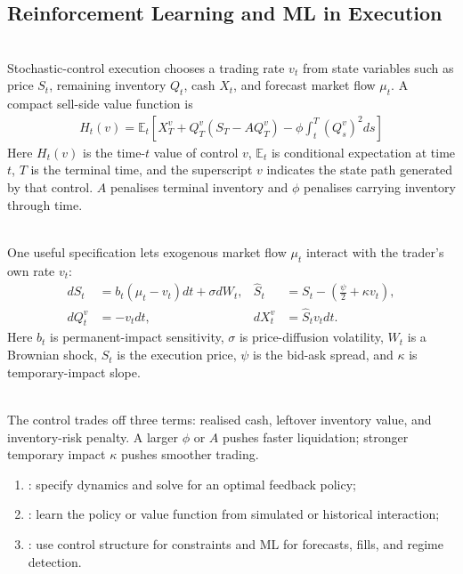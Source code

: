 \subsection{Reinforcement Learning and ML in Execution}

\begin{model} \\
Stochastic-control execution chooses a trading rate $v_t$ from state variables such as price $S_t$, remaining inventory $Q_t$, cash $X_t$, and forecast market flow $\mu_t$. A compact sell-side value function is
\begin{align*}
H_t(v)=\mathbb{E}_t\left[X_T^v+Q_T^v(S_T-AQ_T^v)-\phi\int_t^T(Q_s^v)^2ds\right]
\end{align*}
Here $H_t(v)$ is the time-$t$ value of control $v$, $\mathbb{E}_t$ is conditional expectation at time $t$, $T$ is the terminal time, and the superscript $v$ indicates the state path generated by that control. $A$ penalises terminal inventory and $\phi$ penalises carrying inventory through time.
\end{model}

\begin{model} \\
One useful specification lets exogenous market flow $\mu_t$ interact with the trader's own rate $v_t$:
\begin{align*}
dS_t&=b_t(\mu_t-v_t)dt+\sigma dW_t, & \widehat{S}_t&=S_t-\left(\frac{\psi}{2}+\kappa v_t\right),\\
dQ_t^v&=-v_tdt, & dX_t^v&=\widehat{S}_t v_tdt.
\end{align*}
Here $b_t$ is permanent-impact sensitivity, $\sigma$ is price-diffusion volatility, $W_t$ is a Brownian shock, $\widehat{S}_t$ is the execution price, $\psi$ is the bid-ask spread, and $\kappa$ is temporary-impact slope.
\end{model}

\begin{principle} \\
The control trades off three terms: realised cash, leftover inventory value, and inventory-risk penalty. A larger $\phi$ or $A$ pushes faster liquidation; stronger temporary impact $\kappa$ pushes smoother trading.
\end{principle}

\begin{taxonomy} 
\begin{enumerate}[label=\roman*.]
\setlength{\itemsep}{0pt}
\item {}: specify dynamics and solve for an optimal feedback policy;
\item {}: learn the policy or value function from simulated or historical interaction;
\item {}: use control structure for constraints and ML for forecasts, fills, and regime detection.
\end{enumerate}
\end{taxonomy}
